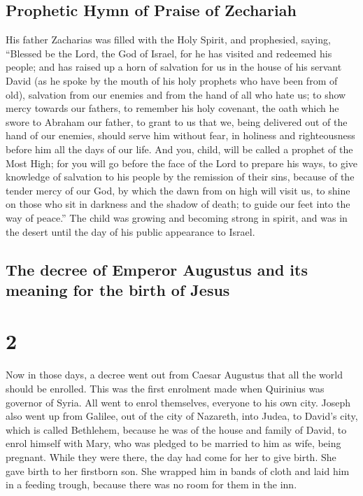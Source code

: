 \hypertarget{prophetic-hymn-of-praise-of-zechariah}{%
\subsection{Prophetic Hymn of Praise of
Zechariah}\label{prophetic-hymn-of-praise-of-zechariah}}

 His father Zacharias was filled with the Holy Spirit,
and prophesied, saying,  ``Blessed be the Lord, the God
of Israel, for he has visited and redeemed his people; 
and has raised up a horn of salvation for us in the house of his servant
David  (as he spoke by the mouth of his holy prophets who
have been from of old),  salvation from our enemies and
from the hand of all who hate us;  to show mercy towards
our fathers, to remember his holy covenant,  the oath
which he swore to Abraham our father,  to grant to us
that we, being delivered out of the hand of our enemies, should serve
him without fear,  in holiness and righteousness before
him all the days of our life.  And you, child, will be
called a prophet of the Most High; for you will go before the face of
the Lord to prepare his ways,  to give knowledge of
salvation to his people by the remission of their sins, 
because of the tender mercy of our God, by which the dawn from on high
will visit us,  to shine on those who sit in darkness and
the shadow of death; to guide our feet into the way of peace.''
 The child was growing and becoming strong in spirit, and
was in the desert until the day of his public appearance to Israel.

\hypertarget{the-decree-of-emperor-augustus-and-its-meaning-for-the-birth-of-jesus}{%
\subsection{The decree of Emperor Augustus and its meaning for the birth
of
Jesus}\label{the-decree-of-emperor-augustus-and-its-meaning-for-the-birth-of-jesus}}

\hypertarget{section-1}{%
\section{2}\label{section-1}}

 Now in those days, a decree went out from Caesar Augustus
that all the world should be enrolled.  This was the first
enrolment made when Quirinius was governor of Syria.  All
went to enrol themselves, everyone to his own city. 
Joseph also went up from Galilee, out of the city of Nazareth, into
Judea, to David's city, which is called Bethlehem, because he was of the
house and family of David,  to enrol himself with Mary,
who was pledged to be married to him as wife, being pregnant.
 While they were there, the day had come for her to give
birth.  She gave birth to her firstborn son. She wrapped
him in bands of cloth and laid him in a feeding trough, because there
was no room for them in the inn.

